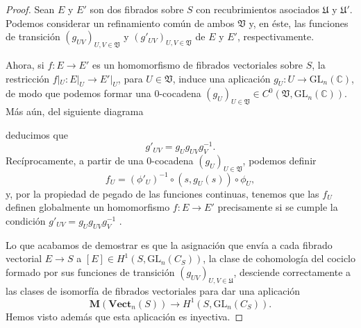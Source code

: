 \documentclass[12pt,a4paper]{article}
\theoremstyle{definition} \newtheorem{defn}[thm]{Definición}
\theoremstyle{definition} \newtheorem{ejemplo}[thm]{Ejemplo}
\theoremstyle{definition} \newtheorem{ejercicio}[thm]{Ejercicio}
\def\CC{\mathbb{C}}
\def\UU{\mathfrak{U}}
\def\VV{\mathfrak{V}}
\def\GL{\mathrm{GL}}
\begin{document}
	  \begin{proof}
	  Sean $E$ y $E'$ son dos fibrados sobre $S$ con recubrimientos asociados $\UU$ y $\UU'$. Podemos considerar un refinamiento común de ambos $\VV$ y, en éste, las funciones de transición $(g_{UV})_{U,V \in \VV}$ y $(g'_{UV})_{U,V\in \VV}$ de $E$ y $E'$, respectivamente. 
	  
	  Ahora, si $f:E\rightarrow E'$ es un homomorfismo de fibrados vectoriales sobre $S$, la restricción $f|_U:E|_U \rightarrow E'|_U$, para $U\in \VV$, induce una aplicación $g_U:U\rightarrow \GL_n(\CC)$, de modo que podemos formar una $0$-cocadena $(g_U)_{U\in \VV} \in C^0(\VV,\GL_n(\CC))$. Más aún, del siguiente diagrama
	  \begin{center}
	  \end{center}
	  deducimos que
	  \begin{equation*}
	    g'_{UV} = g_U g_{UV} g_V ^{-1} .
	  \end{equation*}
	  Recíprocamente, a partir de una $0$-cocadena $(g_U)_{U\in \VV}$, podemos definir 
	  \begin{equation*}
	    f_U = (\phi'_U)^{-1} \circ (s,g_U(s)) \circ \phi_U,
	  \end{equation*}
	 y, por la propiedad de pegado de las funciones continuas, tenemos que las $f_U$ definen globalmente un homomorfismo $f:E\rightarrow E'$ precisamente si se cumple la condición $g'_{UV} = g_U g_{UV} g_V ^{-1}$ .

	  Lo que acabamos de demostrar es que la asignación que envía a cada fibrado vectorial $E\rightarrow S$ a $[E]\in H^1(S,\GL_n(C_S))$, la clase de cohomología del cociclo formado por sus funciones de transición $(g_{UV})_{U,V \in \UU}$, desciende correctamente a las clases de isomorfía de fibrados vectoriales para dar una aplicación
	  \begin{equation*}
	    \mathbf{M}(\mathbf{Vect}_n(S)) \longrightarrow H^1(S,\GL_n(C_S)).
	  \end{equation*}
	  Hemos visto además que esta aplicación es inyectiva.


\end{proof}
\end{document}
